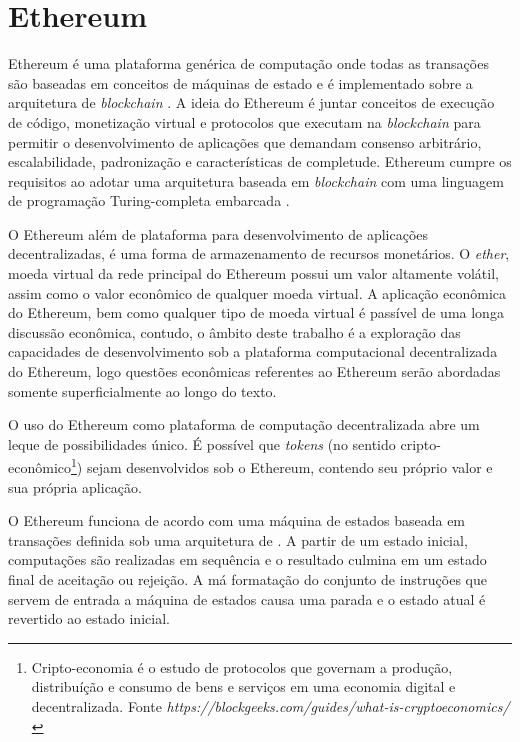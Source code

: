 \documentclass[tcc,capa]{texufpel}
\begin{document}

\section{Ethereum}\label{ssc:ethereum}

    Ethereum é uma plataforma genérica de computação onde todas as transações são baseadas em conceitos de máquinas de estado e é implementado sobre a arquitetura de \textit{blockchain} \cite{wood2014ethereum}. A ideia do Ethereum é juntar conceitos de execução de código, monetização virtual e protocolos que executam na \textit{blockchain} para permitir o desenvolvimento de aplicações que demandam consenso arbitrário, escalabilidade, padronização e características de completude. Ethereum cumpre os requisitos ao adotar uma arquitetura baseada em \textit{blockchain} com uma linguagem de programação Turing-completa embarcada \cite{buterin2014next}.
    
    O Ethereum além de plataforma para desenvolvimento de aplicações decentralizadas, é uma forma de armazenamento de recursos monetários. O \textit{ether}, moeda virtual da rede principal do Ethereum possui um valor altamente volátil, assim como o valor econômico de qualquer moeda virtual. A aplicação econômica do Ethereum, bem como qualquer tipo de moeda virtual é passível de uma longa discussão econômica, contudo, o âmbito deste trabalho é a exploração das capacidades de desenvolvimento sob a plataforma computacional decentralizada do Ethereum, logo questões econômicas referentes ao Ethereum serão abordadas somente superficialmente ao longo do texto.
    
    O uso do Ethereum como plataforma de computação decentralizada abre um leque de possibilidades único. É possível que \textit{tokens} (no sentido cripto-econômico\footnote{Cripto-economia é o estudo de protocolos que governam a produção, distribuíção e consumo de bens e serviços em uma economia digital e decentralizada. Fonte \textit{https://blockgeeks.com/guides/what-is-cryptoeconomics/}}) sejam desenvolvidos sob o Ethereum, contendo seu próprio valor e sua própria aplicação. 
    
    O Ethereum funciona de acordo com uma máquina de estados baseada em transações definida sob uma arquitetura de \bchain. A partir de um estado inicial, computações são realizadas em sequência e o resultado culmina em um estado final de aceitação ou rejeição. A má formatação do conjunto de instruções que servem de entrada a máquina de estados causa uma parada e o estado atual é revertido ao estado inicial.
    
\end{document}
